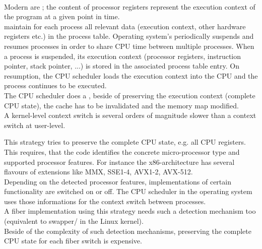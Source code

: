 \label{implementations}

\xspace\\

Modern  are ; the content of
processor registers represent the execution context of the program at a given
point in time.\\
 maintain for each process all relevant data (execution
context, other hardware registers etc.) in the process table. Operating system's
 periodically suspends and resumes processes in order to
share CPU time between multiple processes. When a process is suspended, its
execution context (processor registers, instruction pointer, stack pointer, ...)
is stored in the associated process table entry. On resumption, the CPU
scheduler loads the execution context into the CPU and the process continues to
be executed.\\
The CPU scheduler does a , beside of preserving
the execution context (complete CPU state), the cache has to be invalidated and
the memory map modified.\\
A kernel-level context switch is several orders of magnitude slower than a
context switch at user-level\cite{Tanenbaum2009}.

 This strategy tries to
preserve the complete CPU state, e.g. all CPU registers. This requires, that the
code identifies the concrete micro-processor type and supported processor
features. For instance the x86-architecture has several flavours of extensions
like MMX, SSE1-4, AVX1-2, AVX-512.\\
Depending on the detected processor features, implementations of certain
functionality are switched on or off. The CPU scheduler in the operating system
uses those informations for the context switch  between processes.\\
A fiber implementation using this strategy needs such a detection mechanism
too (equivalent to swapper/ in the Linux kernel).\\
Beside of the complexity of such detection mechanisms, preserving the complete
CPU state for each fiber switch is expensive.


